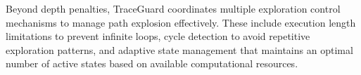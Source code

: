 Beyond depth penalties, TraceGuard coordinates multiple exploration control mechanisms to manage path explosion effectively. These include execution length limitations to prevent infinite loops, cycle detection to avoid repetitive exploration patterns, and adaptive state management that maintains an optimal number of active states based on available computational resources.
